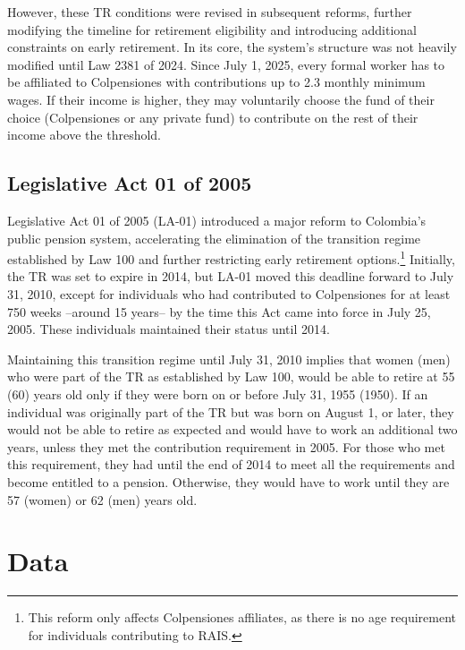 \documentclass[12pt, a4paper]{article}
\begin{document}
However, these TR conditions were revised in subsequent reforms, further modifying the timeline for retirement eligibility and introducing additional constraints on early retirement. In its core, the system's structure was not heavily modified until Law 2381 of 2024. Since July 1, 2025, every formal worker has to be affiliated to Colpensiones with contributions up to 2.3 monthly minimum wages. If their income is higher, they may voluntarily choose the fund of their choice (Colpensiones or any private fund) to contribute on the rest of their income above the threshold.

\subsection{Legislative Act 01 of 2005 \label{subsec:la01}}

Legislative Act 01 of 2005 (LA-01) introduced a major reform to Colombia’s public pension system, accelerating the elimination of the transition regime established by Law 100 and further restricting early retirement options.\footnote{This reform only affects Colpensiones affiliates, as there is no age requirement for individuals contributing to RAIS.} Initially, the TR was set to expire in 2014, but LA-01 moved this deadline forward to July 31, 2010, except for individuals who had contributed to Colpensiones for at least 750 weeks --around 15 years-- by the time this Act came into force in July 25, 2005. These individuals maintained their status until 2014.

Maintaining this transition regime until July 31, 2010 implies that women (men) who were part of the TR as established by Law 100, would be able to retire at 55 (60) years old only if they were born on or before July 31, 1955 (1950). If an individual was originally part of the TR but was born on August 1, or later, they would not be able to retire as expected and would have to work an additional two years, unless they met the contribution requirement in 2005. For those who met this requirement, they had until the end of 2014 to meet all the requirements and become entitled to a pension. Otherwise, they would have to work until they are 57 (women) or 62 (men) years old.



\section{Data \label{sec:data}}
\end{document}
